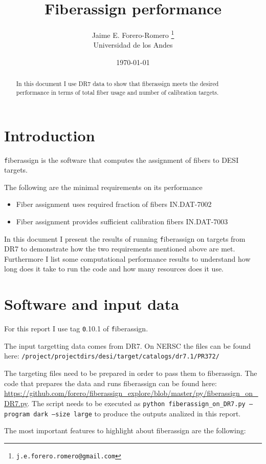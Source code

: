 \documentclass{article}
\title{Fiberassign performance}
\author{Jaime E. Forero-Romero \footnote{{\texttt{j.e.forero.romero@gmail.com}}}\\Universidad de los Andes}
\date{\today}
\begin{document}
\maketitle
\begin{abstract}
In this document I use DR7 data to show that fiberassign
meets the desired performance in terms of total fiber usage and number
of calibration targets.  
\end{abstract}

\section{Introduction}
{\texttt fiberassign} is the software that computes the assignment of
fibers to DESI targets. 

The following are the minimal requirements on its performance
\begin{itemize}
\item Fiber assignment uses required fraction of fibers IN.DAT-7002
\item Fiber assignment provides sufficient calibration fibers IN.DAT-7003
\end{itemize}

In this document I present the results of running {\texttt
  fiberassign} on targets from DR7 to demonstrate how the two
requirements mentioned above are met. 
Furthermore I list some computational performance results to
understand how long does it take to run the code and how many
resources does it use.

\section{Software and input data}

For this report I use tag {\texttt 0.10.1} of {\texttt fiberassign}. 

The input targetting data comes from DR7. On NERSC the files can be found here:
{\texttt{/project/projectdirs/desi/target/catalogs/dr7.1/PR372/}}

The targeting files need to be prepared in order to pass them to
fiberassign.
The code that prepares the data and runs fiberassign can be found
here:
\url{https://github.com/forero/fiberassign_explore/blob/master/py/fiberassign_on_DR7.py}.
The script needs to be executed as {\texttt{python fiberassign\_on\_DR7.py --program dark
--size large}} to produce the outputs analized in this report.

The most important features to highlight about fiberassign are the
following:
\end{document}

